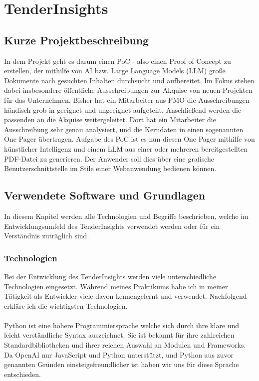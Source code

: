 \chapter{TenderInsights}

\section{Kurze Projektbeschreibung}
In dem Projekt geht es darum einen PoC - also einen Proof of Concept zu erstellen, der mithilfe von AI bzw. Large
Language Models (LLM) große Dokumente nach gesuchten Inhalten durchsucht und aufbereitet. Im Fokus stehen dabei
insbesondere öffentliche Ausschreibungen zur Akquise von neuen Projekten für das Unternehmen. Bisher hat ein Mitarbeiter
aus PMO die Ausschreibungen händisch grob in geeignet und ungeeignet aufgeteilt. Anschließend werden die passenden an
die Akquise weitergeleitet. Dort hat ein Mitarbeiter die Ausschreibung sehr genau analysiert, und die Kerndaten in einen
sogenannten One Pager übertragen. Aufgabe des PoC ist es nun diesen One Pager mithilfe von künstlicher Intelligenz und
einem LLM aus einer oder mehreren bereitgestellten PDF-Datei zu generieren. Der Anwender soll dies über eine grafische
Benutzerschnittstelle im Stile einer Webanwendung bedienen können.

\section{Verwendete Software und Grundlagen}
In diesem Kapitel werden alle Technologien und Begriffe beschrieben, welche im Entwicklungsumfeld des TenderInsights
verwendet werden oder für ein Verständnis zuträglich sind.

\subsection{Technologien}
Bei der Entwicklung des TenderInsights werden viele unterschiedliche Technologien eingesetzt. Während meines Praktikums
habe ich in meiner Tätigkeit als Entwickler viele davon kennengelernt und verwendet. Nachfolgend erkläre ich die
wichtigsten Technologien.

\subsubsection{\textcite{python}}
Python ist eine höhere Programmiersprache welche sich durch ihre klare und leicht verständliche Syntax auszeichnet. Sie
ist bekannt für ihre zahlreichen Standardbibliotheken und ihrer reichen Auswahl an Modulen und Frameworks. Da OpenAI nur
JavaScript und Python unterstützt, und Python aus zuvor genannten Gründen einsteigefreundlicher ist haben wir uns für
diese Sprache entschieden.


